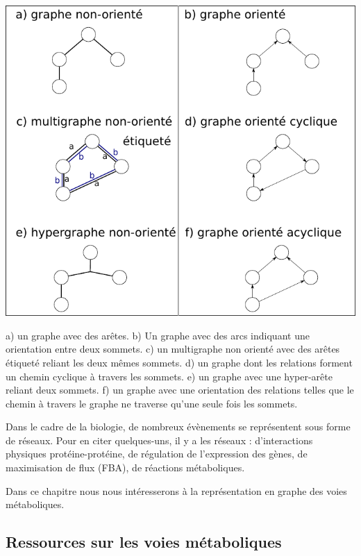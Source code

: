 \begin{refsegment}
    
    \begin{shadedfigure}[H]
    	\centering
    	\includegraphics[width=\textwidth]{img/graph.pdf}
    	\caption{a) un graphe  avec des arêtes. b) Un graphe avec des arcs indiquant une orientation entre deux sommets. c) un multigraphe non orienté avec des arêtes étiqueté reliant les deux mêmes sommets. d) un graphe dont les relations forment un chemin cyclique à travers les sommets. e) un graphe avec une hyper-arête reliant deux sommets. f) un graphe avec une orientation des relations telles que le chemin à travers le graphe ne traverse qu'une seule fois les sommets. }
    	\label{fig:graphe}
    \end{shadedfigure}
    
    
    
    Dans le cadre de la biologie, de nombreux évènements se représentent sous forme de réseaux. Pour en citer quelques-uns, il y a les réseaux : d'interactions physiques protéine-protéine, de régulation de l'expression des gènes, de maximisation de flux (\acrfull{FBA}), de réactions métaboliques. 
    
    Dans ce chapitre nous nous intéresserons à la représentation en graphe des voies métaboliques. 
    
    \subsection{Ressources sur les voies métaboliques}
    

\end{refsegment}
